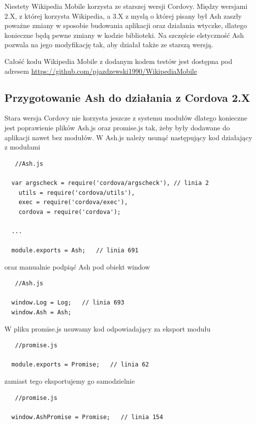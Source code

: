 \documentclass[brudnopis]{xmgr}
\begin{document}
Niestety Wikipedia Mobile korzysta ze starszej wersji Cordovy. Między wersjami 2.X, z której korzysta Wikipedia, a 3.X z myslą o której pisany był Ash zaszły poważne zmiany w sposobie budowania aplikacji oraz działania wtyczke, dlatego konieczne będą pewne zmiany w kodzie biblioteki. Na szczęście elstyczność Ash pozwala na jego modyfikację tak, aby działał także ze starszą wersją.

Całość kodu Wikipedia Mobile z dodanym kodem testów jest dostępna pod adresem \url{https://github.com/pjazdzewski1990/WikipediaMobile} 

\subsection{Przygotowanie Ash do działania z Cordova 2.X}
  
Stara wersja Cordovy nie korzysta jeszcze z systemu modułów dlatego konieczne jest poprawienie plików Ash.js oraz promise.js tak, żeby były dodawane do aplikacji nawet bez modułów.  W Ash.js należy usunąć następujący kod działający z modułami

\begin{lstlisting}
   //Ash.js
  
  var argscheck = require('cordova/argscheck'), // linia 2
    utils = require('cordova/utils'),
    exec = require('cordova/exec'),
    cordova = require('cordova');

  ...

  module.exports = Ash;   // linia 691

\end{lstlisting}

oraz manualnie podpiąć Ash pod obiekt window

\begin{lstlisting}
   //Ash.js
  
  window.Log = Log;   // linia 693
  window.Ash = Ash;

\end{lstlisting}

W pliku promise.js usuwamy kod odpowiadający za eksport modułu

\begin{lstlisting}
   //promise.js

  module.exports = Promise;   // linia 62 

\end{lstlisting}

zamiast tego eksportujemy go samodzielnie 

\begin{lstlisting}
   //promise.js
  
  window.AshPromise = Promise;   // linia 154

\end{lstlisting}
\end{document}
